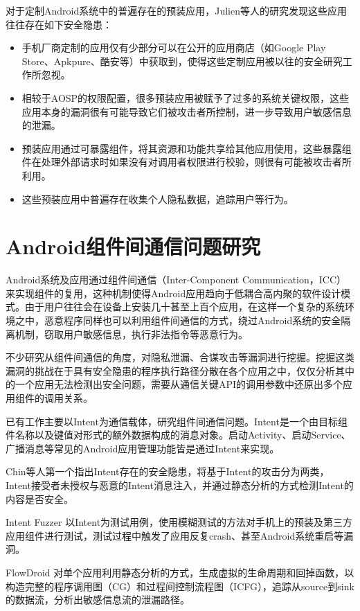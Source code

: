 \documentclass[winfonts,master,twoside]{njuthesis}
\begin{document}
对于定制Android系统中的普遍存在的预装应用，Julien等人的研究\cite{gamba2020analysis}发现这些应用往往存在如下安全隐患：
\begin{itemize}
	\item 手机厂商定制的应用仅有少部分可以在公开的应用商店（如Google Play Store、Apkpure、酷安等）中获取到，使得这些定制应用被以往的安全研究工作所忽视。
	\item 相较于AOSP的权限配置，很多预装应用被赋予了过多的系统关键权限，这些应用本身的漏洞很有可能导致它们被攻击者所控制，进一步导致用户敏感信息的泄漏。
	\item 预装应用通过可暴露组件，将其资源和功能共享给其他应用使用，这些暴露组件在处理外部请求时如果没有对调用者权限进行校验，则很有可能被攻击者所利用。
	\item 这些预装应用中普遍存在收集个人隐私数据，追踪用户等行为。
\end{itemize}

\section{Android组件间通信问题研究}

Android系统及应用通过组件间通信（Inter-Component Communication，ICC）来实现组件的复用，这种机制使得Android应用趋向于低耦合高内聚的软件设计模式。由于用户往往会在设备上安装几十甚至上百个应用，在这样一个复杂的系统环境之中，恶意程序同样也可以利用组件间通信的方式，绕过Android系统的安全隔离机制，窃取用户敏感信息，执行非法指令等恶意行为。

不少研究从组件间通信的角度，对隐私泄漏、合谋攻击等漏洞进行挖掘。挖掘这类漏洞的挑战在于具有安全隐患的程序执行路径分散在各个应用之中，仅仅分析其中的一个应用无法检测出安全问题，需要从通信关键API的调用参数中还原出多个应用组件的调用关系。

已有工作主要以Intent为通信载体，研究组件间通信问题。Intent是一个由目标组件名称以及键值对形式的额外数据构成的消息对象。启动Activity、启动Service、广播消息等常见的Android应用管理功能皆是通过Intent来实现。

Chin等人第一个指出Intent存在的安全隐患，将基于Intent的攻击分为两类，Intent接受者未授权与恶意的Intent消息注入，并通过静态分析的方式检测Intent的内容是否安全\cite{chin2011analyzing}。

Intent Fuzzer \cite{sasnauskas2014intent}以Intent为测试用例，使用模糊测试的方法对手机上的预装及第三方应用组件进行测试，测试过程中触发了应用反复crash、甚至Android系统重启等漏洞。

FlowDroid \cite{arzt2014flowdroid}对单个应用利用静态分析的方式，生成虚拟的生命周期和回掉函数，以构造完整的程序调用图（CG）和过程间控制流程图（ICFG），追踪从source到sink的数据流，分析出敏感信息流的泄漏路径。
\end{document}
